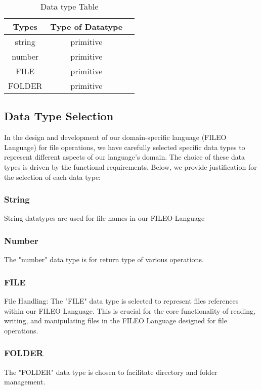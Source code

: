 \documentclass{article}
\begin{document}
\begin{table}[h]
\centering
\caption{Data type Table}
\label{tab:Datatypes}
\begin{tabular}{ c c c }
\hline
Types & Type of Datatype  \\
\hline
string & primitive \\
number & primitive \\
FILE & primitive \\
FOLDER &primitive\\
\hline
\end{tabular}
\end{table}

\subsection{Data Type Selection}
In the design and development of our domain-specific language (FILEO Language) for file operations, we have carefully selected specific data types to represent different aspects of our language's domain. The choice of these data types is driven by the functional requirements. Below, we provide justification for the selection of each data type:

\subsubsection{String}
String datatypes are used for file names in our FILEO Language

\subsubsection{Number}
The "number" data type is for return type of various operations. 

\subsubsection{FILE}
File Handling: The "FILE" data type is selected to represent files references within our FILEO Language. This is crucial for the core functionality of reading, writing, and manipulating files in the FILEO Language designed for file operations.

\subsubsection{FOLDER}
The "FOLDER" data type is chosen to facilitate directory and folder management.
\end{document}
